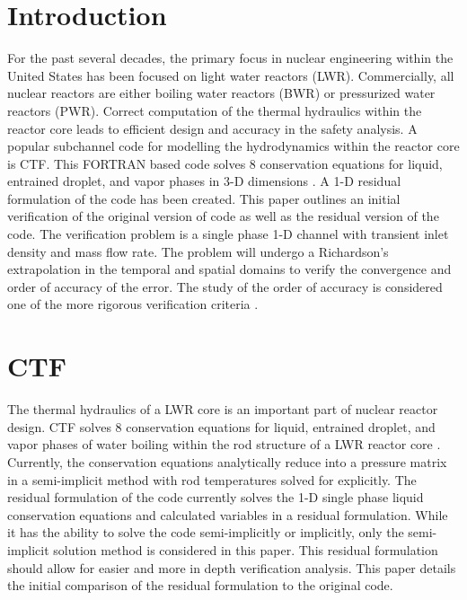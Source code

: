 \documentclass{mc2015}
\begin{document}
\clearpage

%

\section{Introduction}

For the past several decades, the primary focus in nuclear engineering within
the United States has been focused on light water reactors (LWR). Commercially,
all nuclear reactors are either boiling water reactors (BWR) or pressurized
water reactors (PWR). Correct computation of the thermal hydraulics within the
reactor core leads to efficient design and accuracy in the safety analysis. A
popular subchannel code for modelling the hydrodynamics within the reactor core
is CTF. This FORTRAN based code solves 8 conservation equations for liquid,
entrained droplet, and vapor phases in 3-D dimensions \cite{CTF_Theory}. A 1-D
residual formulation of the code has been created. This paper outlines an
initial verification of the original version of code as well as the residual
version of the code. The verification problem is a single phase 1-D channel with
transient inlet density and mass flow rate. The problem will undergo a
Richardson's extrapolation in the temporal and spatial domains to verify the
convergence and order of accuracy of the error. The study of the order of
accuracy is considered one of the more rigorous verification criteria
\cite{VV_review}.

\section{CTF}

The thermal hydraulics of a LWR core is an important part of nuclear
reactor design. CTF solves 8 conservation equations for liquid,
entrained droplet, and vapor phases of water boiling within the rod structure
of a LWR reactor core \cite{CTF_Theory}. Currently, the conservation
equations analytically reduce into a pressure matrix in a semi-implicit
method with rod temperatures solved for explicitly. The residual formulation of
the code currently solves the 1-D single phase liquid conservation equations and
calculated variables in a residual formulation. While it has the ability to
solve the code semi-implicitly or implicitly, only the semi-implicit
solution method is considered in this paper. This residual formulation should
allow for easier and more in depth verification  analysis. This paper details
the initial comparison of the residual  formulation to the original code.
\end{document}
